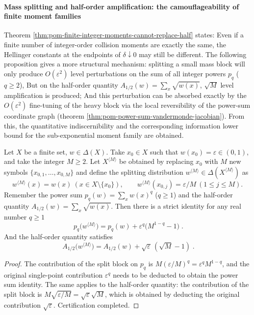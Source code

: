 
\paragraph{Mass splitting and half-order amplification: the camouflageability of finite moment families}
Theorem \ref{thm:pom-finite-integer-moments-cannot-replace-half} states: Even if a finite number of integer-order collision moments are exactly the same, the Hellinger constants at the endpoints of \(\delta\downarrow 0\) may still be different.
The following proposition gives a more structural mechanism: splitting a small mass block will only produce \(O(\varepsilon^2)\) level perturbations on the sum of all integer powers \(p_q\) (\(q\ge 2\)),
But on the half-order quantity \(A_{1/2}(w)=\sum_x\sqrt{w(x)}\), \(\sqrt{M}\) level amplification is produced;
And this perturbation can be absorbed exactly by the \(O(\varepsilon^2)\) fine-tuning of the heavy block via the local reversibility of the power-sum coordinate graph (theorem \ref{thm:pom-power-sum-vandermonde-jacobian}).
From this, the quantitative indiscernibility and the corresponding information lower bound for the sub-exponential moment family are obtained.

\begin{proposition}\label{prop:pom-mass-splitting-moment-root-transform}
Let \(X\) be a finite set, \(w\in\Delta(X)\).
Take \(x_0\in X\) such that \(w(x_0)=\varepsilon\in(0,1)\), and take the integer \(M\ge 2\).
Let \(X^{\langle M\rangle}\) be obtained by replacing \(x_0\) with \(M\) new symbols \(\{x_{0,1},\dots,x_{0,M}\}\) and define the splitting distribution \(w^{\langle M\rangle}\in\Delta(X^{\langle M\rangle})\) as
\[
w^{\langle M\rangle}(x)=w(x)\ (x\in X\setminus\{x_0\}),\qquad
w^{\langle M\rangle}(x_{0,j})=\varepsilon/M\ (1\le j\le M).
\]
Remember the power sum \(p_q(w)=\sum_x w(x)^q\) (\(q\ge 1\)) and the half-order quantity \(A_{1/2}(w)=\sum_x\sqrt{w(x)}\).
Then there is a strict identity for any real number \(q\ge 1\)
\[
\boxed{\;
p_q\!\bigl(w^{\langle M\rangle}\bigr)=p_q(w)+\varepsilon^q\bigl(M^{1-q}-1\bigr)\; }.
\]
And the half-order quantity satisfies
\[
\boxed{\;
A_{1/2}\!\bigl(w^{\langle M\rangle}\bigr)=A_{1/2}(w)+\sqrt{\varepsilon}\,(\sqrt{M}-1)\; }.
\]
\end{proposition}
\begin{proof}
The contribution of the split block on \(p_q\) is \(M(\varepsilon/M)^q=\varepsilon^q M^{1-q}\), and the original single-point contribution \(\varepsilon^q\) needs to be deducted to obtain the power sum identity.
The same applies to the half-order quantity: the contribution of the split block is \(M\sqrt{\varepsilon/M}=\sqrt{\varepsilon}\sqrt{M}\), which is obtained by deducting the original contribution \(\sqrt{\varepsilon}\). Certification completed.
\end{proof}

